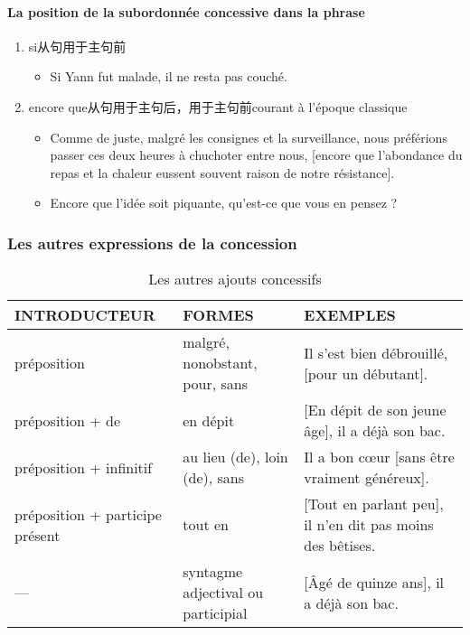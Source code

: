 \documentclass[UTF8]{report}
\begin{document}
\paragraph{La position de la subordonnée concessive dans la phrase}
\begin{enumerate}
    \item si从句用于主句前
    \begin{itemize}
        \item Si Yann fut malade, il ne resta pas couché.
    \end{itemize}
    \item encore que从句用于主句后，用于主句前courant à l’époque classique
    \begin{itemize}
        \item Comme de juste, malgré les consignes et la surveillance, nous préférions passer ces deux heures à chuchoter entre nous, [encore que l’abondance du repas et la chaleur eussent souvent raison de notre résistance].
        \item Encore que l’idée soit piquante, qu’est-ce que vous en pensez ? 
    \end{itemize}
\end{enumerate}


\subsubsection{Les autres expressions de la concession}

\begin{table}[H]
    \centering 
    \small
    \begin{tabular}{|p{3cm}|p{6cm}|p{6cm}|}
    \hline
    \rowcolor{cyan!20}
    \textbf{INTRODUCTEUR} & \textbf{FORMES} & \textbf{EXEMPLES} \\
    \hline
    préposition & malgré, nonobstant, pour, sans & Il s'est bien débrouillé, [pour un débutant]. \\
    \hline
    préposition + de & en dépit & [En dépit de son jeune âge], il a déjà son bac. \\
    \hline
    préposition + infinitif & au lieu (de), loin (de), sans & Il a bon cœur [sans être vraiment généreux]. \\
    \hline
    préposition + participe présent & tout en & [Tout en parlant peu], il n'en dit pas moins des bêtises. \\
    \hline
    --- & syntagme adjectival ou participial & [Âgé de quinze ans], il a déjà son bac. \\
    \hline
    \end{tabular}
    \caption{Les autres ajouts concessifs}
\end{table}
\end{document}
